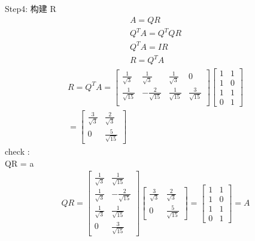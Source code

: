 \documentclass[12pt]{article}
\begin{document}
\begin{flushleft}
    Step4: 构建 R \\
    \begin{align}
        A = QR           \\
        Q^{T}A = Q^{T}QR \\
        Q^{T}A = IR      \\
        R = Q^{T}A
    \end{align}
    \begin{align}
        R = Q^{T}A = \begin{bmatrix}
                         \frac{1}{\sqrt{3}}  & \frac{1}{\sqrt{3}}   & \frac{1}{\sqrt{3}}  & 0                   \\
                         \frac{1}{\sqrt{15}} & -\frac{2}{\sqrt{15}} & \frac{1}{\sqrt{15}} & \frac{3}{\sqrt{15}} \\
                     \end{bmatrix} \begin{bmatrix}
                                       1 & 1 \\
                                       1 & 0 \\
                                       1 & 1 \\
                                       0 & 1
                                   \end{bmatrix} \\
        = \begin{bmatrix}
              \frac{3}{\sqrt{3}} & \frac{2}{\sqrt{3}}  \\
              0                  & \frac{5}{\sqrt{15}}
          \end{bmatrix}
    \end{align}
    check : \\
    QR = a \\
    \begin{align}
        QR = \begin{bmatrix}
                 \frac{1}{\sqrt{3}} & \frac{1}{\sqrt{15}}  \\
                 \frac{1}{\sqrt{3}} & -\frac{2}{\sqrt{15}} \\
                 \frac{1}{\sqrt{3}} & \frac{1}{\sqrt{15}}  \\
                 0                  & \frac{3}{\sqrt{15}}
             \end{bmatrix}\begin{bmatrix}
                              \frac{3}{\sqrt{3}} & \frac{2}{\sqrt{3}}  \\
                              0                  & \frac{5}{\sqrt{15}}
                          \end{bmatrix}
        = \begin{bmatrix}
              1 & 1 \\
              1 & 0 \\
              1 & 1 \\
              0 & 1
          \end{bmatrix} = A \\
    \end{align}


\end{flushleft}
\end{document}
